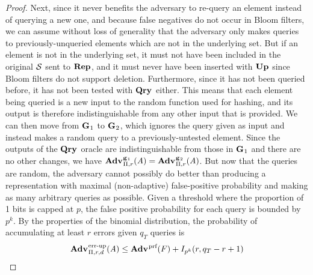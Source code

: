 \begin{proof}
Next, since it never benefits the adversary to re-query an element instead of
querying a new one, and because false negatives do not occur in Bloom filters,
we can assume without loss of generality that the adversary only makes queries
to previously-unqueried elements which are not in the underlying set. But if an
element is not in the underlying set, it must not have been included in the
original $\mathcal{S}$ sent to $\mathbf{Rep}\hspace{0.5pt}$, and it must never have been inserted with
$\mathbf{Up}\hspace{0.5pt}$ since Bloom filters do not support deletion. Furthermore, since it has
not been queried before, it has not been tested with $\mathbf{Qry}\hspace{0.5pt}$ either. This means
that each element being queried is a new input to the random function used for
hashing, and its output is therefore indistinguishable from any other input that
is provided. We can then move from $\mathbf{G}\hspace{0.5pt}_1$ to $\mathbf{G}\hspace{0.5pt}_2$, which ignores the
query given as input and instead makes a random query to a previously-untested
element. Since the outputs of the $\mathbf{Qry}\hspace{0.5pt}$ oracle are indistinguishable from
those in $\mathbf{G}\hspace{0.5pt}_1$ and there are no other changes, we have
$\Adv{\game_1}_{\struct,r}(\advA) = \Adv{\game_2}_{\struct,r}(\advA)$. But now
that the queries are random, the adversary cannot possibly do better than
producing a representation with maximal (non-adaptive) false-positive
probability and making as many arbitrary queries as possible. Given a threshold
where the proportion of 1 bits is capped at $p$, the false positive probability
for each query is bounded by $p^k$. By the properties of the binomial
distribution, the probability of accumulating at least $r$ errors given $q_T$
queries is
$$\Adv{\errep}_{\struct,r,d}(\advA) \le \Adv{\prf}(F) + I_{p^k}(r, q_T-r+1)$$

\end{proof}


